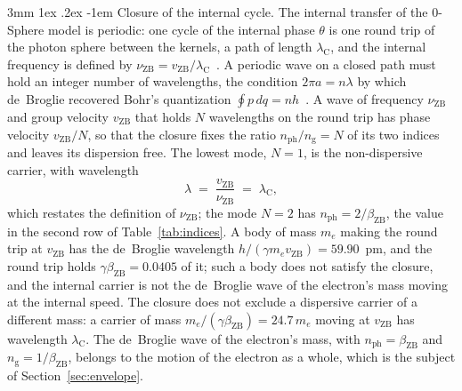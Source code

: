 \documentclass[%
 reprint, amsmath,amssymb, aps, prb, ]{revtex4-2}
\makeatletter
\numberwithin{equation}{section}
\renewcommand\paragraph{%
  \@startsection{paragraph}{4}{\z@}%
    {3mm \@plus 1ex \@minus .2ex}%
    {-1em}%
    {\normalfont\normalsize\itshape}}
\newcommand{\iphase}{\theta}  %
\newcommand{\lambdaC}{\lambda_{\mathrm{C}}}
\newcommand{\bZB}{\beta_{\mathrm{ZB}}}
\newcommand{\nph}{n_{\mathrm{ph}}}
\newcommand{\ngr}{n_{\mathrm{g}}}
\makeatother
\begin{document}
\paragraph{Closure of the internal cycle.} The internal transfer of the 0-Sphere model is periodic: one cycle of the internal phase $\iphase$ is one round trip of the photon sphere between the kernels, a path of length $\lambdaC$, and the internal frequency is defined by $\nu_{\mathrm{ZB}} = v_{\mathrm{ZB}}/\lambdaC$~\cite{H51, H66}. A periodic wave on a closed path must hold an integer number of wavelengths, the condition $2\pi a = n\lambda$ by which de~Broglie recovered Bohr's quantization $\oint p\,dq = nh$~\cite{deBroglie1925, Yukawa1954}. A wave of frequency $\nu_{\mathrm{ZB}}$ and group velocity $v_{\mathrm{ZB}}$ that holds $N$ wavelengths on the round trip has phase velocity $v_{\mathrm{ZB}}/N$, so that the closure fixes the ratio $\nph/\ngr = N$ of its two indices and leaves its dispersion free. The lowest mode, $N = 1$, is the non-dispersive carrier, with wavelength
\begin{equation}
\lambda \;=\; \frac{v_{\mathrm{ZB}}}{\nu_{\mathrm{ZB}}} \;=\; \lambdaC,
\label{eq:lambda_carrier}
\end{equation}
which restates the definition of $\nu_{\mathrm{ZB}}$; the mode $N = 2$ has $\nph = 2/\bZB$, the value in the second row of Table~\ref{tab:indices}. A body of mass $m_e$ making the round trip at $v_{\mathrm{ZB}}$ has the de~Broglie wavelength $h/(\gamma m_ev_{\mathrm{ZB}}) = 59.90$~pm, and the round trip holds $\gamma\bZB = 0.0405$ of it; such a body does not satisfy the closure, and the internal carrier is not the de~Broglie wave of the electron's mass moving at the internal speed. The closure does not exclude a dispersive carrier of a different mass: a carrier of mass $m_e/(\gamma\bZB) = 24.7\,m_e$ moving at $v_{\mathrm{ZB}}$ has wavelength $\lambdaC$. The de~Broglie wave of the electron's mass, with $\nph = \bZB$ and $\ngr = 1/\bZB$, belongs to the motion of the electron as a whole, which is the subject of Section~\ref{sec:envelope}.
\end{document}

